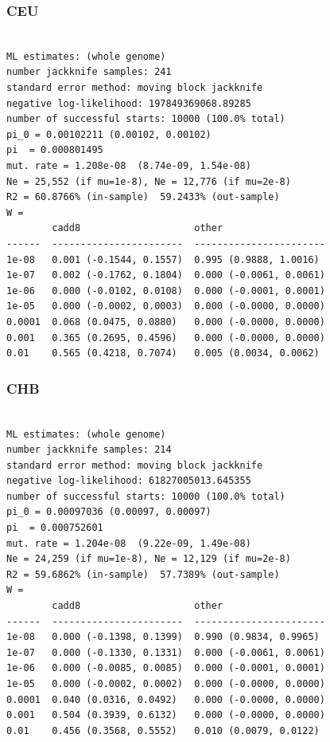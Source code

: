 \documentclass[11pt]{article}
\begin{document}
\subsubsection*{CEU}
\begin{minipage}{\linewidth}\begin{footnotesize}
\begin{verbatim}

ML estimates: (whole genome)
number jackknife samples: 241
standard error method: moving block jackknife
negative log-likelihood: 197849369068.89285
number of successful starts: 10000 (100.0% total)
pi_0 = 0.00102211 (0.00102, 0.00102)
pi  = 0.000801495
mut. rate = 1.208e-08  (8.74e-09, 1.54e-08)
Ne = 25,552 (if mu=1e-8), Ne = 12,776 (if mu=2e-8)
R2 = 60.8766% (in-sample)  59.2433% (out-sample)
W = 
        cadd8                    other
------  -----------------------  -----------------------
1e-08   0.001 (-0.1544, 0.1557)  0.995 (0.9888, 1.0016)
1e-07   0.002 (-0.1762, 0.1804)  0.000 (-0.0061, 0.0061)
1e-06   0.000 (-0.0102, 0.0108)  0.000 (-0.0001, 0.0001)
1e-05   0.000 (-0.0002, 0.0003)  0.000 (-0.0000, 0.0000)
0.0001  0.068 (0.0475, 0.0880)   0.000 (-0.0000, 0.0000)
0.001   0.365 (0.2695, 0.4596)   0.000 (-0.0000, 0.0000)
0.01    0.565 (0.4218, 0.7074)   0.005 (0.0034, 0.0062)
\end{verbatim}
\end{footnotesize}\end{minipage}


\subsubsection*{CHB}
\begin{minipage}{\linewidth}\begin{footnotesize}
\begin{verbatim}

ML estimates: (whole genome)
number jackknife samples: 214
standard error method: moving block jackknife
negative log-likelihood: 61827005013.645355
number of successful starts: 10000 (100.0% total)
pi_0 = 0.00097036 (0.00097, 0.00097)
pi  = 0.000752601
mut. rate = 1.204e-08  (9.22e-09, 1.49e-08)
Ne = 24,259 (if mu=1e-8), Ne = 12,129 (if mu=2e-8)
R2 = 59.6862% (in-sample)  57.7389% (out-sample)
W = 
        cadd8                    other
------  -----------------------  -----------------------
1e-08   0.000 (-0.1398, 0.1399)  0.990 (0.9834, 0.9965)
1e-07   0.000 (-0.1330, 0.1331)  0.000 (-0.0061, 0.0061)
1e-06   0.000 (-0.0085, 0.0085)  0.000 (-0.0001, 0.0001)
1e-05   0.000 (-0.0002, 0.0002)  0.000 (-0.0000, 0.0000)
0.0001  0.040 (0.0316, 0.0492)   0.000 (-0.0000, 0.0000)
0.001   0.504 (0.3939, 0.6132)   0.000 (-0.0000, 0.0000)
0.01    0.456 (0.3568, 0.5552)   0.010 (0.0079, 0.0122)
\end{verbatim}
\end{footnotesize}\end{minipage}
\end{document}

